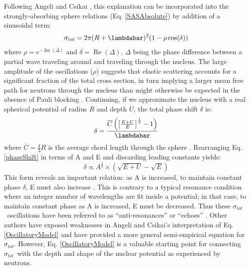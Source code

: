 \documentclass[twocolumn,secnumarabic,amssymb, nobibnotes, aps, prl,
superscriptaddress, nobalancelastpage]{revtex4}
\newcommand{\tot}{\ensuremath{\sigma_{tot}}}
\begin{document}
Following Angeli and Csikai \cite{Angeli1970}, this explanation can be
incorporated into the strongly-absorbing sphere relations (Eq. \ref{SASAbsolute}) 
by addition of a sinusoidal term:
\begin{equation} \label{OscillatoryModel}
    \tot = 2\pi (R+\lambdabar)^{2}(1 - \rho \cos(\delta))
\end{equation}
where $\rho = e^{-\operatorname{Im}(\Delta)}$ and $\delta =
\operatorname{Re}(\Delta)$, $\Delta$ being the phase difference between a
partial wave traveling
around and traveling through the nucleus. The large amplitude of the
oscillations ($\rho$) suggests that elastic scattering accounts for a
significant fraction of the total cross section, in turn implying a 
larger mean free path for neutrons through the nucleus 
than might otherwise be expected in the absence of Pauli blocking
\cite{Mohr1955, Feshbach1958}.
Continuing, if we approximate the nucleus with a
real spherical potential of radius $R$ and depth $U$, the total phase shift $\delta$ is:
\begin{equation} \label{phaseShift}
    \delta =
    \frac{\overline{C}\left(\left[{\frac{E+U}{E}}\right]^{\frac{1}{2}}-1\right)}{\lambdabar}
\end{equation}
where $\overline{C} = \frac{4}{3}R$ is the average chord length through the
sphere \cite{Angeli1970}. Rearranging Eq. \ref{phaseShift} in terms of A and E and
discarding leading constants yields:
\begin{equation}
    \delta \propto A^{\frac{1}{3}}\times\left(\sqrt{E+U}-\sqrt{E}\right)
\end{equation}
This form reveals an important relation: as A is increased, to maintain constant 
phase $\delta$, E must also increase \cite{Satchler1980, Peterson1962}. 
This is contrary to a typical resonance condition where an integer number of wavelengths
are fit inside a potential; in that case, to maintain constant phase as A is increased,
E must be decreased. Thus these \tot\ oscillations have been referred to as
``anti-resonances'' or ``echoes'' \cite{Satchler1980, McVoy1967}.
Other authors \cite{Ahmad1973} have
exposed weaknesses in Angeli and Csikai's interpretation of
Eq. \ref{OscillatoryModel} and have provided a more general semi-empirical
equation for \tot. However, Eq. \ref{OscillatoryModel} is a valuable starting
point for connecting \tot\ with the depth and shape of the nuclear
potential as experienced by neutrons.
\end{document}
